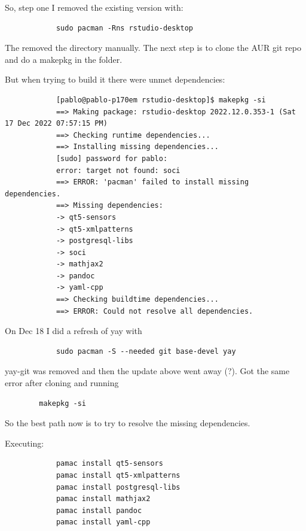 \documentclass[]{scrartcl}
\begin{document}
	So, step one I removed the existing version with:
	
	\begin{small}
		\begin{verbatim}
			sudo pacman -Rns rstudio-desktop	
		\end{verbatim}
	\end{small}
	
	
	The removed the directory manually.
	The next step is to clone the AUR git repo and do a makepkg in the folder.
	
	But when trying to build it there were unmet dependencies:
	
	\begin{tiny}
		\begin{verbatim}
			[pablo@pablo-p170em rstudio-desktop]$ makepkg -si
			==> Making package: rstudio-desktop 2022.12.0.353-1 (Sat 17 Dec 2022 07:57:15 PM)
			==> Checking runtime dependencies...
			==> Installing missing dependencies...
			[sudo] password for pablo: 
			error: target not found: soci
			==> ERROR: 'pacman' failed to install missing dependencies.
			==> Missing dependencies:
			-> qt5-sensors
			-> qt5-xmlpatterns
			-> postgresql-libs
			-> soci
			-> mathjax2
			-> pandoc
			-> yaml-cpp
			==> Checking buildtime dependencies...
			==> ERROR: Could not resolve all dependencies.
		\end{verbatim}
	\end{tiny}
	
	On Dec 18 I did a refresh of yay with
	\begin{small}
		\begin{verbatim}
			sudo pacman -S --needed git base-devel yay	
	    \end{verbatim}
	\end{small}
	yay-git was removed and then the update above went away (?). Got the same error after cloning and running 
	\begin{verbatim}
		makepkg -si
	\end{verbatim}
	
	So the best path now is to try to resolve the missing dependencies.
	
	Executing:
	
	\begin{small}
		\begin{verbatim}
			pamac install qt5-sensors
			pamac install qt5-xmlpatterns
			pamac install postgresql-libs
			pamac install mathjax2
			pamac install pandoc
			pamac install yaml-cpp
		\end{verbatim}
	\end{small}
	
\end{document}

